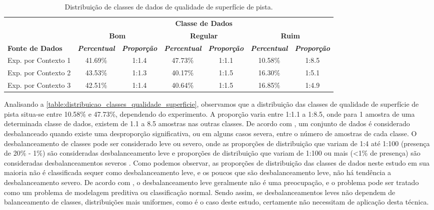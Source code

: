 \begin{table}[h]
\caption{Distribuição de classes de dados de qualidade de superfície de pista.}
\label{table:distribuicao_classes_qualidade_superficie}
\centering
\scriptsize
\begin{tabular}{lcccccc}
\cmidrule(l){2-7}
\multicolumn{1}{c}{\multirow{2}{*}{\textbf{}}} & 
\multicolumn{6}{c}{\textbf{Classe de Dados}} \\ \cmidrule(l){2-7} 
\multicolumn{1}{c}{} & 
\multicolumn{2}{c}{\textbf{Bom}} & 
\multicolumn{2}{c}{\textbf{Regular}} & 
\multicolumn{2}{c}{\textbf{Ruim}} \\ \midrule
\textbf{Fonte de Dados} & 
\textit{\textbf{Percentual}} & 
\textit{\textbf{Proporção}} & 
\textit{\textbf{Percentual}} & 
\textit{\textbf{Proporção}} & 
\textit{\textbf{Percentual}} & 
\textit{\textbf{Proporção}} \\ \midrule
Exp. por Contexto 1 & 41.69\% & 1:1.4 & 47.73\% & 1:1.1 & 10.58\% & 1:8.5 \\ \midrule
Exp. por Contexto 2 & 43.53\% & 1:1.3 & 40.17\% & 1:1.5 & 16.30\% & 1:5.1 \\ \midrule
Exp. por Contexto 3 & 42.51\% & 1:1.4 & 40.64\% & 1:1.5 & 16.85\% & 1:4.9 \\ \bottomrule
\end{tabular}
\end{table}

Analisando a \autoref{table:distribuicao_classes_qualidade_superficie}, observamos que a distribuição das classes de qualidade de superfície de pista situa-se entre 10.58\% e 47.73\%, dependendo do experimento. A proporção varia entre 1:1.1 a 1:8.5, onde para 1 amostra de uma determinada classe de dados, existem de 1.1 a 8.5 amostras nas outras classes. De acordo com \cite{Fernandez2018}, um conjunto de dados é considerado desbalanceado quando existe uma desproporção significativa, ou em alguns casos severa, entre o número de amostras de cada classe. O desbalanceamento de classes pode ser considerado leve ou severo, onde as proporções de distribuição que variam de 1:4 até 1:100 (presença de 20\% - 1\%) são consideradas desbalanceamento leve e proporções de distribuição que variam de 1:100 ou mais (<1\% de presença) são consideradas desbalanceamentos severos \cite{Krawczyk2016,Brownlee2020}. Como podemos observar, as proporções de distribuição das classes de dados neste estudo em sua maioria não é classificada sequer como desbalanceamento leve, e os poucos que são desbalanceamento leve, não há tendência a desbalanceamento severo. De acordo com \cite{Brownlee2020}, o desbalanceamento leve geralmente não é uma preocupação, e o problema pode ser tratado como um problema de modelagem preditiva ou classificação normal. Sendo assim, se desbalanceamentos leves não dependem de balanceamento de classes, distribuições mais uniformes, como é o caso deste estudo, certamente não necessitam de aplicação desta técnica.

